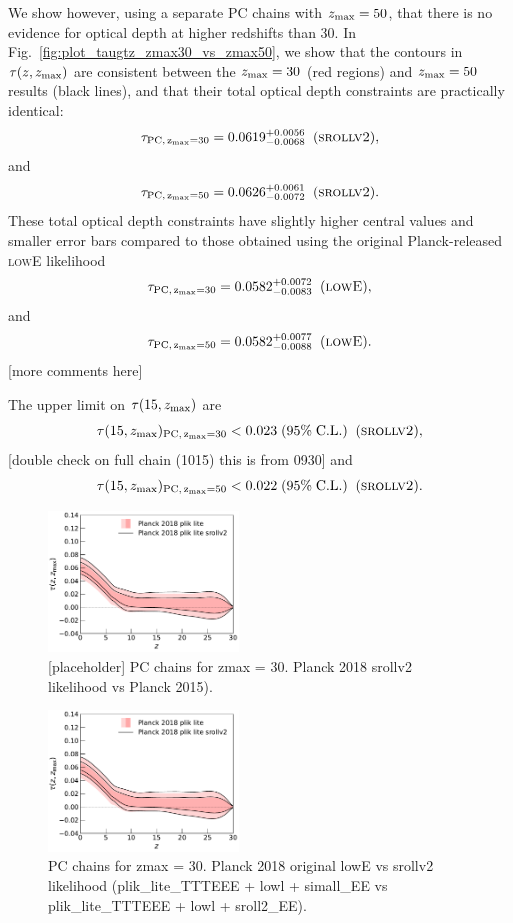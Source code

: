 \documentclass[prd,twocolumn,amsmath,amssymb,floatfix,superscriptaddress,nofootinbib]{revtex4-1}
\newcommand{\zmax}{z_{\rm max}}
\newcommand{\beq}{\begin{equation}}
\newcommand{\eeq}{\end{equation}}
\begin{document}
We show however, using a separate PC chains with $\zmax = 50$, that there is no evidence for optical depth at higher redshifts than 30. In Fig.~\ref{fig:plot_taugtz_zmax30_vs_zmax50}, we show that the contours in $\tau(z, \zmax)$ are consistent between the $\zmax = 30$ (red regions) and $\zmax = 50$ results (black lines), and that their total optical depth constraints are practically identical: 
\beq
\tau_{\rm PC,\, \zmax=30} = 0.0619^{+0.0056}_{-0.0068}\;\; (\textsc{srollv2}),
\eeq
and
\beq
\tau_{\rm PC,\, \zmax=50} = 0.0626^{+0.0061}_{-0.0072}\;\; (\textsc{srollv2}).
\eeq
These total optical depth constraints have slightly higher central values and smaller error bars compared to those obtained using the original Planck-released \textsc{lowE} likelihood
\beq
\tau_{\rm PC,\, \zmax=30} = 0.0582 ^{+0.0072}_{-0.0083}\;\; (\textsc{lowE}),
\eeq
and
\beq
\tau_{\rm PC,\, \zmax=50} = 0.0582^{+0.0077}_{-0.0088}\;\; (\textsc{lowE}).
\eeq
[more comments here]
%

The upper limit on $\tau(15, \zmax)$ are 
\beq
\tau(15, \zmax)_{\rm PC,\, \zmax=30} < 0.023 \; (95\%\; \mathrm{C.L.})\;\;(\textsc{srollv2}),
\eeq
[double check on full chain (1015) this is from 0930]
and 
\beq
\tau(15, \zmax)_{\rm PC,\, \zmax=50} < 0.022 \; (95\%\; \mathrm{C.L.})\;\;(\textsc{srollv2}).
\eeq

\begin{figure}[ht]
\includegraphics[width=0.45\textwidth]{results/direct_mcmc/pl18_plots_zmax30/plot_pub_tau_gtz_dz_0p1_pl18_pc_zmax30_pliklite_post_0930_and_pl18_pc_zmax30_pliklite_srollv2_0930.pdf}
\caption{[placeholder] PC chains for zmax = 30. Planck 2018 srollv2 likelihood vs Planck 2015).
}
\label{fig:plot_taugtz_2015_vs_2018}
\end{figure}

\begin{figure}[ht]
\includegraphics[width=0.45\textwidth]{results/direct_mcmc/pl18_plots_zmax30/plot_pub_tau_gtz_dz_0p1_pl18_pc_zmax30_pliklite_post_0930_and_pl18_pc_zmax30_pliklite_srollv2_0930.pdf}
\caption{PC chains for zmax = 30. Planck 2018 original lowE vs srollv2 likelihood (plik\_lite\_TTTEEE + lowl + simall\_EE vs plik\_lite\_TTTEEE + lowl + sroll2\_EE).
}
\label{fig:plot_taugtz_lowE_vs_srollv2}
\end{figure}
\end{document}
